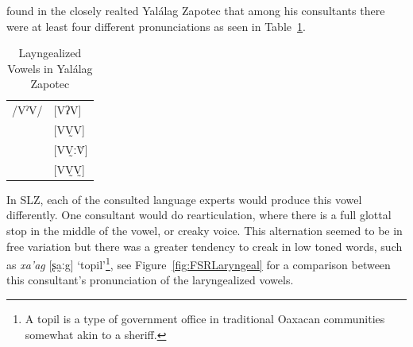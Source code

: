 \documentclass[12pt, letterpaper]{article}
\providecommand{\lsptoprule}{\midrule\toprule}
\providecommand{\lspbottomrule}{\bottomrule\midrule}
\begin{document}
\citet{avelinoAcousticElectroglottographicAnalyses2010} found in the closely realted Yalálag Zapotec that among his consultants there were at least four different pronunciations as seen in Table~\ref{tab:laryngeal}. 
\begin{table}[!h]
	\centering
	\caption{Layngealized Vowels in Yalálag Zapotec}
	\label{tab:laryngeal}
	 \begin{tabular}{ll}
	\lsptoprule
	/VˀV/	&  [VʔV]  \\
			&  [VV̰V]   \\
			&  [VV̰ːV̆]  \\
			&  [VV̰V̰]	\\
	\lspbottomrule
	\end{tabular}
\end{table}
In SLZ, each of the consulted language experts would produce this vowel differently. One consultant would do rearticulation, where there is a full glottal stop in the middle of the vowel, or creaky voice. This alternation seemed to be in free variation but there was a greater tendency to creak in low toned words, such as \textit{xa'ag} [ʂa̰ːg] `topil'\footnote{A topil is a type of government office in traditional Oaxacan communities somewhat akin to a sheriff. }, see Figure~\ref{fig:FSRLaryngeal} for a comparison between this consultant's pronunciation of the laryngealized vowels.
\end{document}
